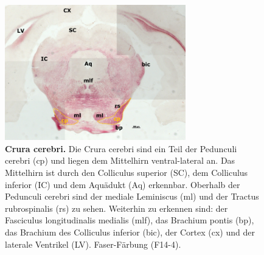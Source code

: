 \documentclass[12pt,a4paper,pdftex]{article}
\begin{document}
\begin{figure}[H]
    \centering
    \includegraphics[width=0.7\textwidth]{pictures/Bilder_Laura/cerebral_peduncle_F14_4P_025x.png}
    \caption[Crura cerebri]{\textbf{Crura cerebri.} Die Crura cerebri sind ein Teil der Pedunculi cerebri (cp) und liegen dem Mittelhirn ventral-lateral an. Das Mittelhirn ist durch den Colliculus superior (SC), dem Colliculus inferior (IC) und dem Aquädukt (Aq) erkennbar. Oberhalb der Pedunculi cerebri sind der mediale Leminiscus (ml) und der Tractus rubrospinalis (rs) zu sehen. Weiterhin zu erkennen sind: der Fasciculus longitudinalis medialis (mlf), das Brachium pontis (bp), das Brachium des Colliculus inferior (bic), der Cortex (cx) und der laterale Ventrikel (LV). Faser-Färbung (F14-4).}
    \label{fig:crura_cerebri}
\end{figure}
\end{document}
